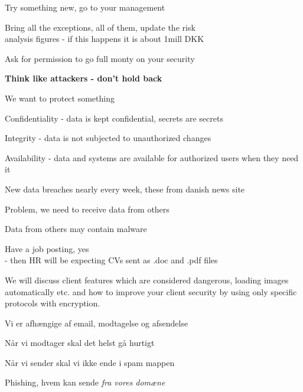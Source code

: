 \documentclass[Screen16to9,17pt]{foils}
\begin{document}
Try something new, go to your management

Bring all the exceptions, all of them, update the risk \\
analysis figures - if this happens it is about 1mill DKK

Ask for permission to go full monty on your security

{\bf Think like attackers - don't hold back}




\begin{list1}
\item We want to protect something
\item Confidentiality - data is kept confidential, secrets are secrets
\item Integrity - data is not subjected to unauthorized changes
\item Availability - data and systems are available for authorized users when they need it
\end{list1}




New data breaches nearly every week, these from danish news site 

Problem, we need to receive data from others

Data from others may contain malware

Have a job posting, yes\\
- then HR will be expecting CVs sent as .doc and .pdf files



We will discuss client features which are considered dangerous, loading images automatically etc. and how to improve your client security by using only specific protocols with encryption.





\begin{list2}
\item Vi er afhængige af email, modtagelse og afsendelse
\item Når vi modtager skal det helst gå hurtigt
\item Når vi sender skal vi ikke ende i spam mappen
\item Phishing, hvem kan sende \emph{fra vores domæne}
\end{list2}
\end{document}
